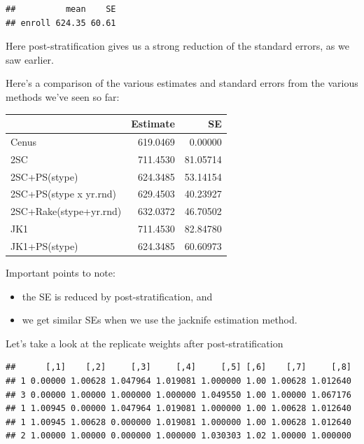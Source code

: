\documentclass[
]{book}
\newenvironment{Shaded}{\begin{snugshade}}{\end{snugshade}}
\newcommand{\DecValTok}[1]{\textcolor[rgb]{0.00,0.00,0.81}{#1}}
\newcommand{\NormalTok}[1]{#1}
\newcommand{\SpecialCharTok}[1]{\textcolor[rgb]{0.81,0.36,0.00}{\textbf{#1}}}
\providecommand{\tightlist}{%
  \setlength{\itemsep}{0pt}\setlength{\parskip}{0pt}}
\begin{document}
\begin{verbatim}
##          mean    SE
## enroll 624.35 60.61
\end{verbatim}

Here post-stratification gives us a strong reduction of the standard errors, as we saw
earlier.

Here's a comparison of the various estimates and standard errors from the
various methods we've seen so far:

\begin{table}
\centering
\begin{tabular}[t]{l|r|r}
\hline
  & Estimate & SE\\
\hline
Cenus & 619.0469 & 0.00000\\
\hline
2SC & 711.4530 & 81.05714\\
\hline
2SC+PS(stype) & 624.3485 & 53.14154\\
\hline
2SC+PS(stype x yr.rnd) & 629.4503 & 40.23927\\
\hline
2SC+Rake(stype+yr.rnd) & 632.0372 & 46.70502\\
\hline
JK1 & 711.4530 & 82.84780\\
\hline
JK1+PS(stype) & 624.3485 & 60.60973\\
\hline
\end{tabular}
\end{table}

Important points to note:

\begin{itemize}
\tightlist
\item
  the SE is reduced by post-stratification, and
\item
  we get similar SEs when we use the jacknife estimation method.
\end{itemize}

Let's take a look at the replicate weights after post-stratification

\begin{Shaded}
\end{Shaded}

\begin{verbatim}
##      [,1]    [,2]     [,3]     [,4]     [,5] [,6]    [,7]     [,8]
## 1 0.00000 1.00628 1.047964 1.019081 1.000000 1.00 1.00628 1.012640
## 3 0.00000 1.00000 1.000000 1.000000 1.049550 1.00 1.00000 1.067176
## 1 1.00945 0.00000 1.047964 1.019081 1.000000 1.00 1.00628 1.012640
## 1 1.00945 1.00628 0.000000 1.019081 1.000000 1.00 1.00628 1.012640
## 2 1.00000 1.00000 0.000000 1.000000 1.030303 1.02 1.00000 1.000000
\end{verbatim}
\end{document}
